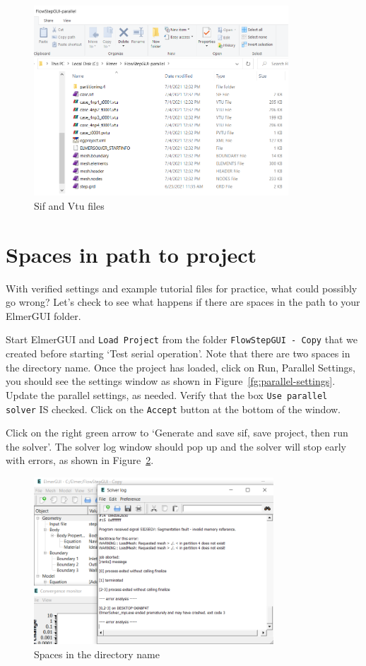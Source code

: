 \begin{figure}[H]
\centering
\includegraphics[width=0.85\textwidth]{parallel-11}
\caption{Sif and Vtu files}\label{fg:results-parallel}
\end{figure}

\section{Spaces in path to project} \label{spaces-in-path}

With verified settings and example tutorial files for practice, what could possibly go wrong?  Let's check to see what happens if there are spaces in the path to your ElmerGUI folder.

Start ElmerGUI and \texttt{Load Project} from the folder \texttt{FlowStepGUI - Copy} that we created before starting `Test serial operation'.  Note that there are two spaces in the directory name.  Once the project has loaded, click on Run, Parallel Settings, you should see the settings window as shown in Figure~\ref{fg:parallel-settings}.  Update the parallel settings, as needed.  Verify that the box \texttt{Use parallel solver} IS checked.  Click on the \texttt{Accept} button at the bottom of the window.

Click on the right green arrow to `Generate and save sif, save project,  then run the solver'.  The solver log window  should pop up and the solver will stop early with errors, as shown in Figure~\ref{fg:spaces}.

\begin{figure}[H]
\centering
\includegraphics[width=0.8\textwidth]{parallel-12}
\caption{Spaces in the directory name}\label{fg:spaces}
\end{figure}

